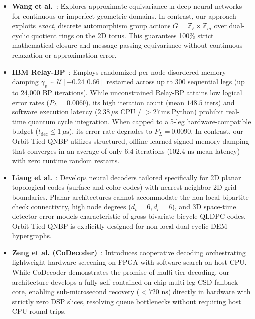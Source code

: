 \documentclass[journal]{IEEEtran}
\begin{document}
\begin{itemize}
    \item \textbf{Wang et al.}~\cite{wang2022approximately}: Explores approximate equivariance in deep neural networks for continuous or imperfect geometric domains. In contrast, our approach exploits \textit{exact}, discrete automorphism group actions $G = \mathbb{Z}_\ell \times \mathbb{Z}_m$ over dual-cyclic quotient rings on the 2D torus. This guarantees 100\% strict mathematical closure and message-passing equivariance without continuous relaxation or approximation error.
    \item \textbf{IBM Relay-BP}~\cite{muller2025relay}: Employs randomized per-node disordered memory damping $\gamma_v \sim \mathcal{U}[-0.24, 0.66]$ restarted across up to 300 sequential legs (up to 24,000 BP iterations). While unconstrained Relay-BP attains low logical error rates ($P_L = 0.0060$), its high iteration count (mean $148.5$ iters) and software execution latency ($2.38\,\mu\text{s}$ CPU / $>27\,\text{ms}$ Python) prohibit real-time quantum cycle integration. When capped to a 5-leg hardware-compatible budget ($t_{\text{dec}} \le 1\,\mu\text{s}$), its error rate degrades to $P_L = 0.0090$. In contrast, our Orbit-Tied QNBP utilizes structured, offline-learned signed memory damping that converges in an average of only $6.4$ iterations ($102.4\text{ ns}$ mean latency) with zero runtime random restarts.
    \item \textbf{Liang et al.}~\cite{liang2025planar}: Develops neural decoders tailored specifically for 2D planar topological codes (surface and color codes) with nearest-neighbor 2D grid boundaries. Planar architectures cannot accommodate the non-local bipartite check connectivity, high node degrees ($d_v=6, d_c=6$), and 3D space-time detector error models characteristic of gross bivariate-bicycle QLDPC codes. Orbit-Tied QNBP is explicitly designed for non-local dual-cyclic DEM hypergraphs.
    \item \textbf{Zeng et al. (CoDecoder)}~\cite{codecoder2026}: Introduces cooperative decoding orchestrating lightweight hardware screening on FPGA with software search on host CPU. While CoDecoder demonstrates the promise of multi-tier decoding, our architecture develops a fully self-contained on-chip multi-leg CSD fallback core, enabling sub-microsecond recovery ($<720\text{ ns}$) directly in hardware with strictly zero DSP slices, resolving queue bottlenecks without requiring host CPU round-trips.
\end{itemize}
\end{document}
